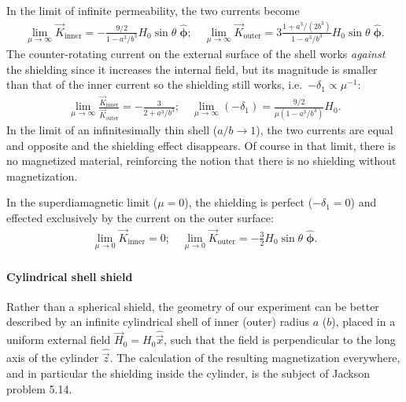 In the limit of infinite permeability, the two currents become
%
\begin{align*}
   \lim_{\mu\to\infty}\vec K_\text{inner}=-\frac{9/2}{1-a^3/b^3}H_0\sin\theta\;\hat{\boldsymbol\phi}
   ;\quad
   \lim_{\mu\to\infty}\vec K_\text{outer}=3\frac{1+a^3/(2b^3)}{1-a^3/b^3}H_0\sin\theta\;\hat{\boldsymbol\phi}.
\end{align*}
%
The counter-rotating current on the external surface of the shell works
\emph{against} the shielding since it increases the internal field, but its
magnitude is smaller than that of the inner current so the shielding still
works, i.e.\ $-\delta_1\propto\mu^{-1}$:
%
\begin{align}
   \label{high_paramagnetic}
   \lim_{\mu\to\infty}\frac{\vec K_\text{inner}}{\vec
   K_\text{outer}}=-\frac{3}{2+a^3/b^3}
   ;\quad
   \lim_{\mu\to\infty}(-\delta_1)=\frac{9/2}{\mu(1-a^3/b^3)}H_0.
\end{align}
%
In the limit of an infinitesimally thin shell ($a/b\to1$), the two currents are
equal and opposite and the shielding effect disappears. Of course in that limit,
there is no magnetized material, reinforcing the notion that there is no
shielding without magnetization.

In the superdiamagnetic limit ($\mu=0$), the shielding is perfect
($-\delta_1=0$) and effected exclusively by the current on the outer surface:
%
\begin{align}
   \label{superdiamagnetic_shell}
   \lim_{\mu\to0}\vec K_\text{inner}=0;\quad
   \lim_{\mu\to0}\vec K_\text{outer}=-\frac{3}{2}H_0\sin\theta\;\hat{\boldsymbol\phi}.
\end{align}
%

\paragraph{Cylindrical shell shield}

Rather than a spherical shield, the geometry of our experiment can be better
described by an infinite cylindrical shell of inner (outer) radius $a$ ($b$),
placed in a uniform external field $\vec H_0=H_0\hat{\vec x}$, such that the
field is perpendicular to the long axis of the cylinder $\hat{\vec z}$. The
calculation of the resulting magnetization everywhere, and in particular the
shielding inside the cylinder, is the subject of Jackson
\cite{jackson1998classical} problem 5.14.

